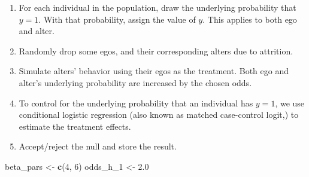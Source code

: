 \documentclass[
]{book}
\newenvironment{Shaded}{\begin{snugshade}}{\end{snugshade}}
\newcommand{\DecValTok}[1]{\textcolor[rgb]{0.00,0.00,0.81}{#1}}
\newcommand{\FloatTok}[1]{\textcolor[rgb]{0.00,0.00,0.81}{#1}}
\newcommand{\FunctionTok}[1]{\textcolor[rgb]{0.13,0.29,0.53}{\textbf{#1}}}
\newcommand{\NormalTok}[1]{#1}
\newcommand{\OtherTok}[1]{\textcolor[rgb]{0.56,0.35,0.01}{#1}}
\begin{document}
\begin{enumerate}
\def\labelenumi{\arabic{enumi}.}
\item
  For each individual in the population, draw the underlying probability that \(y = 1\). With that probability, assign the value of \(y\). This applies to both ego and alter.
\item
  Randomly drop some egos, and their corresponding alters due to attrition.
\item
  Simulate alters' behavior using their egos as the treatment. Both ego and alter's underlying probability are increased by the chosen odds.
\item
  To control for the underlying probability that an individual has \(y = 1\), we use conditional logistic regression (also known as matched case-control logit,) to estimate the treatment effects.
\item
  Accept/reject the null and store the result.
\end{enumerate}

\begin{Shaded}
\begin{Highlighting}[]
\NormalTok{beta\_pars }\OtherTok{\textless{}{-}} \FunctionTok{c}\NormalTok{(}\DecValTok{4}\NormalTok{, }\DecValTok{6}\NormalTok{)}
\NormalTok{odds\_h\_1  }\OtherTok{\textless{}{-}} \FloatTok{2.0}
\end{Highlighting}
\end{Shaded}
\end{document}
